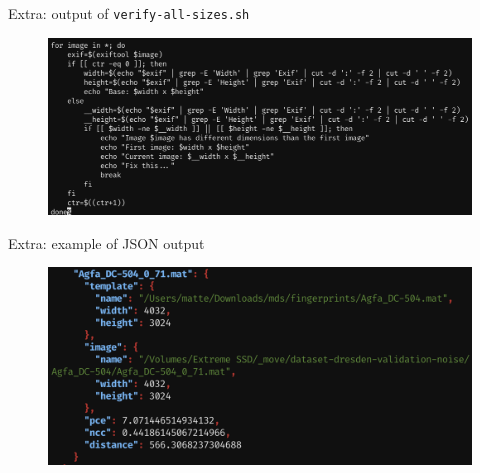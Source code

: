 \begin{frame}{Extra: output of \texttt{verify-all-sizes.sh}}
    
    \begin{figure}
        \centering
        \includegraphics[width=\textwidth]{../drawable/screenshot-verifysizes.png}
    \end{figure}
    
\end{frame}

\begin{frame}{Extra: example of JSON output}
    \begin{figure}
        \centering
        \includegraphics[width=\textwidth]{../drawable/examples/example-output.png}
    \end{figure}
\end{frame}